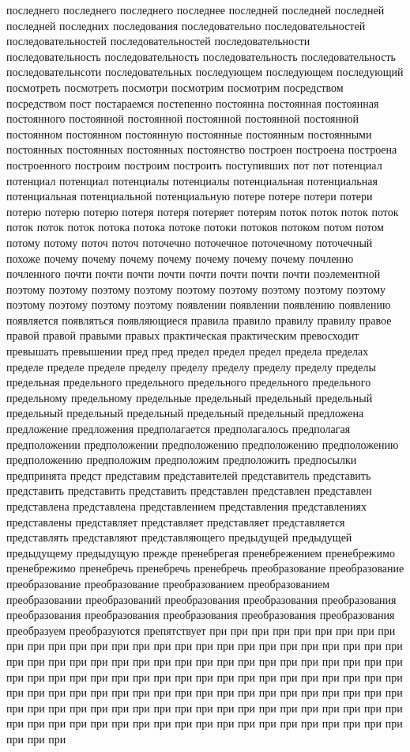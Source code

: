 последнего последнего последнего последнее последней последней последней последней последних последования последовательно последовательностей последовательностей последовательностей последовательности последовательность последовательность последовательность последовательность последовательнсоти последовательных последующем последующем последующий посмотреть посмотреть посмотри посмотрим посмотрим посредством посредством пост постараемся постепенно постоянна постоянная постоянная постоянного постоянной постоянной постоянной постоянной постоянной постоянном постоянном постоянную постоянные постоянным постоянными постоянных постоянных постоянных постоянство построен построена построена построенного построим построим построить поступивших пот пот потенциал потенциал потенциал потенциалы потенциалы потенциальная потенциальная потенциальная потенциальной потенциальную потере потере потери потери потерю потерю потерю потеря потеря потеряет потерям поток поток поток поток поток поток поток потока потока потоке потоки потоков потоком потом потом потому потому поточ поточ поточечно поточечное поточечному поточечный похоже почему почему почему почему почему почему почему почленно почленного почти почти почти почти почти почти почти почти поэлементной поэтому поэтому поэтому поэтому поэтому поэтому поэтому поэтому поэтому поэтому поэтому поэтому поэтому появлении появлении появлению появлению появляется появляться появляющиеся правила правило правилу правилу правое правой правой правыми правых практическая практическим превосходит превышать превышении пред пред предел предел предел предела пределах пределе пределе пределе пределу пределу пределу пределу пределу пределы предельная предельного предельного предельного предельного предельного предельному предельному предельные предельный предельный предельный предельный предельный предельный предельный предельный предложена предложение предложения предполагается предполагалось предполагая предположении предположении предположению предположению предположению предположению предположим предположим предположить предпосылки предпринята предст представим представителей представитель представить представить представить представить представлен представлен представлен представлена представлена представлением представления представлениях представлены представляет представляет представляет представляется представлять представляют представляющего предыдущей предыдущей предыдущему предыдущую прежде пренебрегая пренебрежением пренебрежимо пренебрежимо пренебречь пренебречь пренебречь преобразование преобразование преобразование преобразование преобразованием преобразованием преобразовании преобразований преобразования преобразования преобразования преобразования преобразования преобразования преобразования преобразования преобразуем преобразуются препятствует при при при при при при при при при при при при при при при при при при при при при при при при при при при при при при при при при при при при при при при при при при при при при при при при при при при при при при при при при при при при при при при при при при при при при при при при при при при при при при при при при при при при при при при при при при при при при при при при при при при при при при при при при при при при при при при при при при при при при при при при при при при при при при 